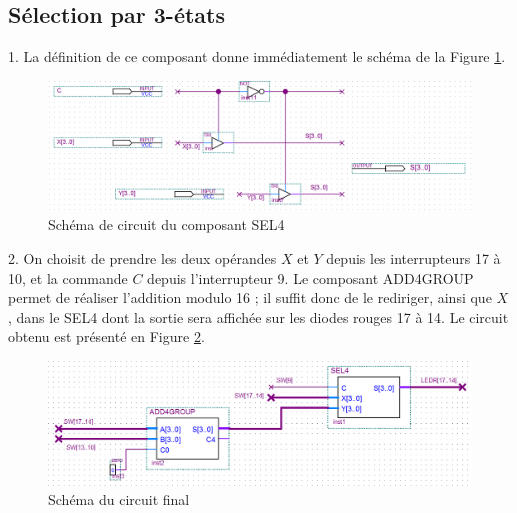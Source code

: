 \documentclass[a4paper,11pt]{article}
\begin{document}
\subsection*{Sélection par 3-états}

1. La définition de ce composant donne immédiatement le schéma de la Figure \ref{sel4}.
\begin{figure}
\center
\includegraphics[scale=0.43]{sel4.png}
\caption{Schéma de circuit du composant SEL4}
\label{sel4}
\end{figure}

2. On choisit de prendre les deux opérandes $X$ et $Y$ depuis les interrupteurs 17 à 10, et la commande $C$ depuis l'interrupteur 9. Le composant ADD4GROUP permet de réaliser l'addition modulo 16 ; il suffit donc de le rediriger, ainsi que $X$, dans le SEL4 dont la sortie sera affichée sur les diodes rouges 17 à 14. Le circuit obtenu est présenté en Figure \ref{circuit}.
\begin{figure}
\center
\includegraphics[scale=0.52]{final.png}
\caption{Schéma du circuit final}
\label{circuit}
\end{figure}
\end{document}
